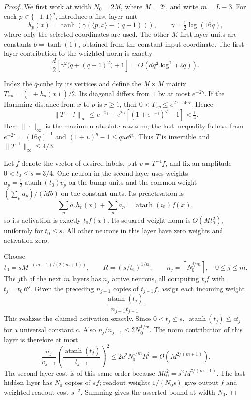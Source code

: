 \begin{proof}
We first work at width $N_0=2M$, where $M=2^q$, and write $m=L-3$.
For each $p\in\{-1,1\}^q$, introduce a first-layer unit
\[
 h_p(x)=\tanh\!\left(\gamma(\langle p,x\rangle-(q-1))\right),
 \qquad \gamma=\tfrac12\log(16q),
\]
where only the selected coordinates are used.  The other $M$ first-layer
units are constants $b=\tanh(1)$, obtained from the constant input coordinate.
The first-layer contribution to the weighted norm is exactly
\[
 \frac d2\left[\gamma^2\bigl(q+(q-1)^2\bigr)+1\right]
 =O\!\left(dq^2\log^2(2q)\right).
\]

Index the $q$-cube by its vertices and define the $M\times M$ matrix
$T_{xp}=(1+h_p(x))/2$.  Its diagonal differs from $1$ by at most
$e^{-2\gamma}$.  If the Hamming distance from $x$ to $p$ is $r\geq1$, then
$0<T_{xp}\leq e^{2\gamma-4\gamma r}$.  Hence
\[
 \|T-I\|_\infty
 \leq e^{-2\gamma}+e^{2\gamma}
            \left[(1+e^{-4\gamma})^q-1\right]<\tfrac14.
\]
Here $\|\cdot\|_\infty$ is the maximum absolute row sum; the last inequality
follows from $e^{-2\gamma}=(16q)^{-1}$ and
$(1+u)^q-1\leq qu e^{qu}$.  Thus $T$ is invertible and
$\|T^{-1}\|_\infty\leq4/3$.

Let $f$ denote the vector of desired labels, put $v=T^{-1}f$, and fix an
amplitude $0<t_0\leq s=3/4$.  One neuron in the second layer uses weights
$a_p=\frac12\operatorname{atanh}(t_0)v_p$ on the bump units and the common
weight $(\sum_p a_p)/(Mb)$ on the constant units.  Its preactivation is
\[
 \sum_p a_p h_p(x)+\sum_p a_p
   =\operatorname{atanh}(t_0)f(x),
\]
so its activation is exactly $t_0f(x)$.  Its squared weight norm is
$O(Mt_0^2)$, uniformly for $t_0\leq s$.  All other neurons in this layer
have zero weights and activation zero.

Choose
\[
 t_0=sM^{-(m-1)/(2(m+1))},\qquad
 R=(s/t_0)^{1/m},\qquad
 n_j=\left\lceil N_0^{j/m}\right\rceil,\quad 0\leq j\leq m.
\]
The $j$th of the next $m$ layers has $n_j$ active neurons, all computing
$t_jf$ with $t_j=t_0R^j$.  Given the preceding $n_{j-1}$ copies of
$t_{j-1}f$, assign each incoming weight
\[
 \frac{\operatorname{atanh}(t_j)}{n_{j-1}t_{j-1}}.
\]
This realizes the claimed activation exactly.  Since $0<t_j\leq s$,
$\operatorname{atanh}(t_j)\leq c t_j$ for a universal constant $c$.
Also $n_j/n_{j-1}\leq2N_0^{1/m}$.  The norm contribution of this layer is
therefore at most
\[
 \frac{n_j}{n_{j-1}}
 \left(\frac{\operatorname{atanh}(t_j)}{t_{j-1}}\right)^2
 \leq 2c^2N_0^{1/m}R^2
 =O\!\left(M^{2/(m+1)}\right).
\]
The second-layer cost is of this same order because
$Mt_0^2=s^2M^{2/(m+1)}$.  The last hidden layer has $N_0$ copies of $sf$;
readout weights $1/(N_0s)$ give output $f$ and weighted readout cost
$s^{-2}$.  Summing gives the asserted bound at width $N_0$.


\end{proof}
